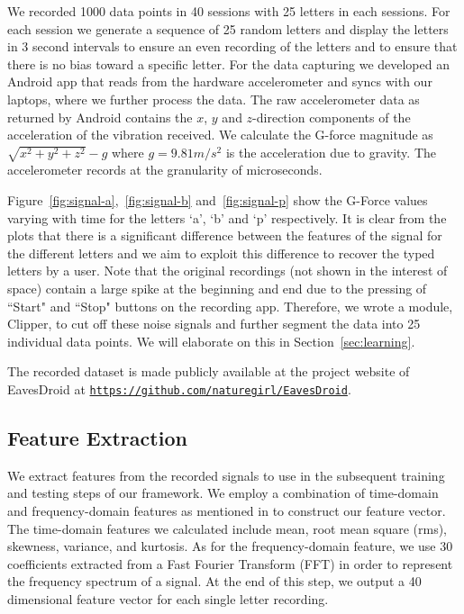 \documentclass[11pt,conference]{IEEEtran}
\begin{document}
We recorded 1000 data points in 40 sessions with 25 letters in each sessions. For each session we generate a sequence of 25 random letters and display the letters in 3 second intervals to ensure an even recording of the letters and to ensure that there is no bias toward a specific letter. For the data capturing we developed an Android app that reads from the hardware accelerometer and syncs with our laptops, where we further process the data. The raw accelerometer data as returned by Android contains the $x$, $y$ and $z$-direction components of the acceleration of the vibration received. We calculate the G-force magnitude as $\sqrt{x^2+y^2+z^2}-g$ where $g = 9.81 m/s^2$ is the acceleration due to gravity. The accelerometer records at the granularity of microseconds.

Figure~\ref{fig:signal-a},~\ref{fig:signal-b} and~\ref{fig:signal-p} show the G-Force values varying with time for the
letters `a', `b' and `p' respectively. It is clear from the plots that there is a significant difference between the features
of the signal for the different letters and we aim to exploit this difference to recover the typed letters by a user.
Note that the original recordings (not shown in the interest of space) contain a large spike at the beginning and end
due to the pressing of ``Start" and ``Stop" buttons on the recording app.
Therefore, we wrote a module, Clipper, to cut off these noise signals and further segment the data into 25 individual data points.
We will elaborate on this in Section~\ref{sec:learning}.

The recorded dataset is made publicly available at the project website of EavesDroid at \texttt{\url{https://github.com/naturegirl/EavesDroid}}.

\subsection{Feature Extraction}
\label{sec:feature-extractor}
We extract features from the recorded signals to use in the subsequent training and testing steps of our framework. We employ a combination of time-domain and frequency-domain features as mentioned in \cite{spiphone} to construct our feature vector. The time-domain features we calculated include mean, root mean square (rms), skewness, variance, and kurtosis. As for the frequency-domain feature, we use 30 coefficients extracted from a Fast Fourier Transform (FFT) in order to represent the frequency spectrum of a signal. At the end of this step, we output a 40 dimensional feature vector for each single letter recording.
\end{document}
